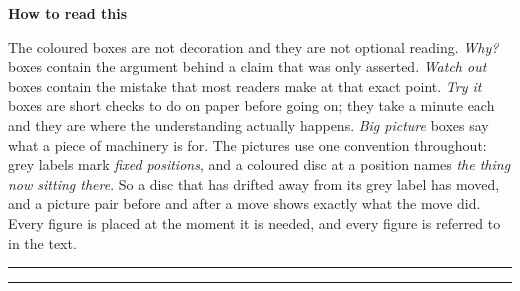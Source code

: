 \vspace{6pt}
{\sffamily\bfseries\large\color{big} How to read this}\par\vspace{2pt}
The coloured boxes are not decoration and they are not optional reading.
\emph{Why?} boxes contain the argument behind a claim that was only asserted.
\emph{Watch out} boxes contain the mistake that most readers make at that exact point.
\emph{Try it} boxes are short checks to do on paper before going on; they take a minute each and
they are where the understanding actually happens.
\emph{Big picture} boxes say what a piece of machinery is for.
The pictures use one convention throughout: grey labels mark \emph{fixed positions}, and a
coloured disc at a position names \emph{the thing now sitting there}. So a disc that has drifted
away from its grey label has moved, and a picture pair before and after a move shows exactly what
the move did. Every figure is placed at the moment it is needed, and every figure is referred to
in the text.

\vspace{4pt}
\hrule
\vspace{6pt}
\tableofcontents
\vspace{6pt}
\hrule
\clearpage
